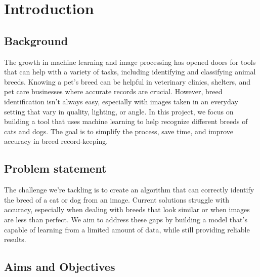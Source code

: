 \chapter{Introduction}
\label{ch:into}

\section{Background}
\label{sec:into_back}
The growth in machine learning and image processing has opened doors for tools that can help with a variety of tasks, including identifying and classifying animal breeds. Knowing a pet’s breed can be helpful in veterinary clinics, shelters, and pet care businesses where accurate records are crucial. However, breed identification isn’t always easy, especially with images taken in an everyday setting that vary in quality, lighting, or angle. In this project, we focus on building a tool that uses machine learning to help recognize different breeds of cats and dogs. The goal is to simplify the process, save time, and improve accuracy in breed record-keeping.\cite{borwarnginn2021knowing}\cite{inproceedings}\cite{raduly2018dog}\cite{unknown}


\section{Problem statement}
\label{sec:intro_prob_art}
The challenge we’re tackling is to create an algorithm that can correctly identify the breed of a cat or dog from an image. Current solutions struggle with accuracy, especially when dealing with breeds that look similar or when images are less than perfect. We aim to address these gaps by building a model that’s capable of learning from a limited amount of data, while still providing reliable results.

\section{Aims and Objectives}
\label{sec:intro_aims_obj}

